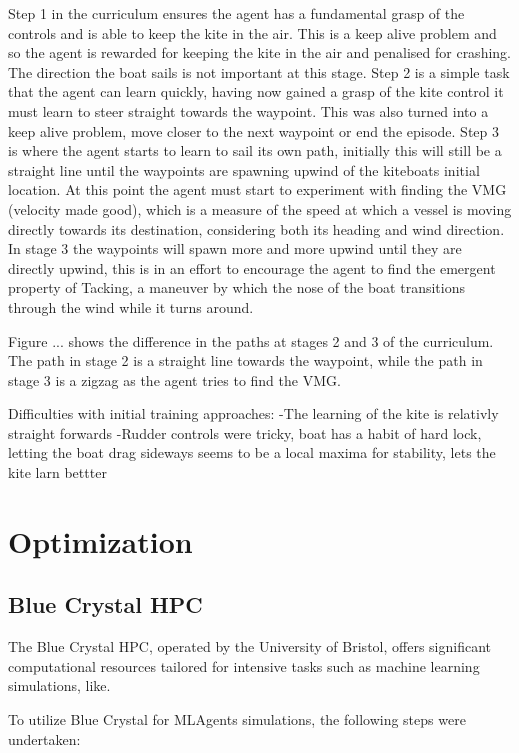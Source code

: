 Step 1 in the curriculum ensures the agent has a fundamental grasp of the controls and is able to keep the kite in the air. This is a keep alive problem and so the agent is rewarded for keeping the kite in the air and penalised for crashing. The direction the boat sails is not important at this stage. Step 2 is a simple task that the agent can learn quickly, having now gained a grasp of the kite control it must learn to steer straight towards the waypoint. This was also turned into a keep alive problem, move closer to the next waypoint or end the episode. Step 3 is where the agent starts to learn to sail its own path, initially this will still be a straight line until the waypoints are spawning upwind of the kiteboats initial location. At this point the agent must start to experiment with finding the VMG (velocity made good), which is a measure of the speed at which a vessel is moving directly towards its destination, considering both its heading and wind direction. In stage 3 the waypoints will spawn more and more upwind until they are directly upwind, this is in an effort to encourage the agent to find the emergent property of Tacking, a maneuver by which the nose of the boat transitions through the wind while it turns around.  

Figure ... shows the difference in the paths at stages 2 and 3 of the curriculum. The path in stage 2 is a straight line towards the waypoint, while the path in stage 3 is a zigzag as the agent tries to find the VMG. 


Difficulties with initial training approaches:
-The learning of the kite is relativly straight forwards
-Rudder controls were tricky, boat has a habit of hard lock, letting the boat drag sideways seems to be a local maxima for stability,  lets the kite larn bettter
\section{Optimization}

\subsection{Blue Crystal HPC}

The Blue Crystal HPC, operated by the University of Bristol, offers significant computational resources tailored for intensive tasks such as machine learning simulations, like.


To utilize Blue Crystal for MLAgents simulations, the following steps were undertaken:


